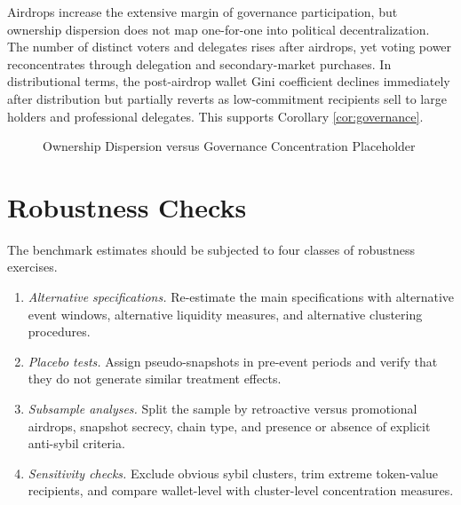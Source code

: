 \documentclass[11pt]{article}
\theoremstyle{remark}
\begin{document}
Airdrops increase the extensive margin of governance participation, but ownership dispersion does not map one-for-one into political decentralization. The number of distinct voters and delegates rises after airdrops, yet voting power reconcentrates through delegation and secondary-market purchases. In distributional terms, the post-airdrop wallet Gini coefficient declines immediately after distribution but partially reverts as low-commitment recipients sell to large holders and professional delegates. This supports Corollary \ref{cor:governance}.

\begin{figure}[H]
\centering
{}
\caption{Ownership Dispersion versus Governance Concentration Placeholder}
\label{fig:governance}
\end{figure}

\section{Robustness Checks}

The benchmark estimates should be subjected to four classes of robustness exercises.

\begin{enumerate}[leftmargin=1.5em]
\item \textit{Alternative specifications.} Re-estimate the main specifications with alternative event windows, alternative liquidity measures, and alternative clustering procedures.
\item \textit{Placebo tests.} Assign pseudo-snapshots in pre-event periods and verify that they do not generate similar treatment effects.
\item \textit{Subsample analyses.} Split the sample by retroactive versus promotional airdrops, snapshot secrecy, chain type, and presence or absence of explicit anti-sybil criteria.
\item \textit{Sensitivity checks.} Exclude obvious sybil clusters, trim extreme token-value recipients, and compare wallet-level with cluster-level concentration measures.
\end{enumerate}
\end{document}
